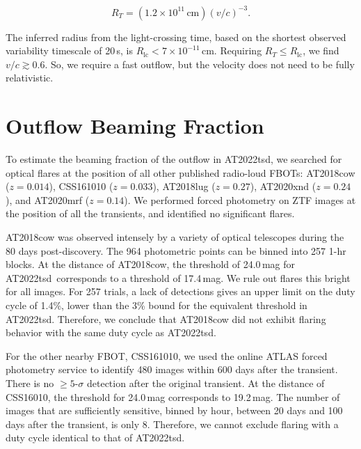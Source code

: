 \documentclass{nature_plusfigure}
\newcommand{\at}{AT2022tsd}
\begin{document}
\begin{methods}
\begin{equation}
    R_T = (1.2 \times 10^{11}\,\mathrm{cm}) (v/c)^{-3}.
\end{equation}

The inferred radius from the light-crossing time, based on the shortest observed variability timescale of 20\,s, is $R_\mathrm{lc} < 7\times10^{-11}\,$cm. Requiring $R_T \leq R_\mathrm{lc}$, we find $v/c \gtrsim 0.6$. So, we require a fast outflow, but the velocity does not need to be fully relativistic. 

\section{Outflow Beaming Fraction}
\label{sec:beaming-fraction}

To estimate the beaming fraction of the outflow in \at, we searched for optical flares at the position of all other published radio-loud FBOTs: AT2018cow\cite{Prentice2018} ($z=0.014$), CSS161010\cite{Coppejans2020} ($z=0.033$),
AT2018lug\cite{Ho2020_Koala} ($z=0.27$),
AT2020xnd\cite{Perley2021} ($z=0.24$), and
AT2020mrf\cite{Yao2022} ($z=0.14$).
We performed forced photometry on ZTF images at the position of all the transients, and identified no significant flares. 

AT2018cow was observed intensely by a variety of optical telescopes during the 80 days post-discovery\cite{Perley2019}. The 964 photometric points can be binned into 257 1-hr blocks. At the distance of AT2018cow, the threshold of 24.0\,mag for \at\ corresponds to a threshold of 17.4\,mag. We rule out flares this bright for all images. For 257 trials, a lack of detections gives an upper limit on the duty cycle of 1.4\%, lower than the 3\% bound for the equivalent threshold in \at. Therefore, we conclude that AT2018cow did not exhibit flaring behavior with the same duty cycle as \at.

For the other nearby FBOT, CSS161010, we used the online ATLAS\cite{Tonry2018,Smith2020} forced photometry service\cite{Shingles2021} to identify 480 images within 600 days after the transient. There is no $\geq5$-$\sigma$ detection after the original transient. At the distance of CSS16010, the threshold for 24.0\,mag corresponds to 19.2\,mag. The number of images that are sufficiently sensitive, binned by hour, between 20 days and 100 days after the transient, is only 8. Therefore, we cannot exclude flaring with a duty cycle identical to that of \at.


\end{methods}
\end{document}
